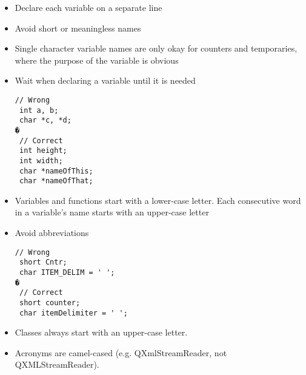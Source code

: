 \documentclass[a4paper,12pt]{article}
\begin{document}
\begin{itemize}
\item  Declare each variable on a separate line
\item  Avoid short or meaningless names
\item  Single character variable names are only okay for counters and temporaries, where the purpose of the variable is obvious
\item  Wait when declaring a variable until it is needed
\begin{lstlisting}[breaklines]
// Wrong
 int a, b;
 char *c, *d;
�
 // Correct
 int height;
 int width;
 char *nameOfThis;
 char *nameOfThat;
 \end{lstlisting}
\item  Variables and functions start with a lower-case letter. Each consecutive word in a variable's name starts with an upper-case letter
\item  Avoid abbreviations
\begin{lstlisting}[breaklines]
 // Wrong
 short Cntr;
 char ITEM_DELIM = ' ';
�
 // Correct
 short counter;
 char itemDelimiter = ' ';
 \end{lstlisting}
\item  Classes always start with an upper-case letter. 
\item  Acronyms are camel-cased (e.g. QXmlStreamReader, not QXMLStreamReader).
\end{itemize}

\end{document}

